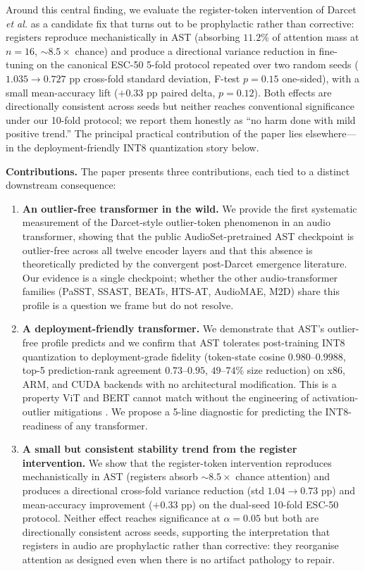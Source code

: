 \documentclass[conference]{IEEEtran}
\begin{document}
Around this central finding, we evaluate the register-token intervention of Darcet \emph{et al.} as a candidate fix that turns out to be prophylactic rather than corrective: registers reproduce mechanistically in AST (absorbing $11.2\%$ of attention mass at $n{=}16$, $\sim 8.5\times$ chance) and produce a directional variance reduction in fine-tuning on the canonical ESC-50 5-fold protocol repeated over two random seeds ($1.035 \to 0.727$ pp cross-fold standard deviation, F-test $p=0.15$ one-sided), with a small mean-accuracy lift ($+0.33$ pp paired delta, $p=0.12$). Both effects are directionally consistent across seeds but neither reaches conventional significance under our 10-fold protocol; we report them honestly as ``no harm done with mild positive trend.'' The principal practical contribution of the paper lies elsewhere---in the deployment-friendly INT8 quantization story below.

\textbf{Contributions.} The paper presents three contributions, each tied to a distinct downstream consequence:
\begin{enumerate}
    \item \textbf{An outlier-free transformer in the wild.} We provide the first systematic measurement of the Darcet-style outlier-token phenomenon in an audio transformer, showing that the public AudioSet-pretrained AST checkpoint is outlier-free across all twelve encoder layers and that this absence is theoretically predicted by the convergent post-Darcet emergence literature. Our evidence is a single checkpoint; whether the other audio-transformer families (PaSST, SSAST, BEATs, HTS-AT, AudioMAE, M2D) share this profile is a question we frame but do not resolve.
    \item \textbf{A deployment-friendly transformer.} We demonstrate that AST's outlier-free profile predicts and we confirm that AST tolerates post-training INT8 quantization to deployment-grade fidelity (token-state cosine $0.980$--$0.9988$, top-5 prediction-rank agreement $0.73$--$0.95$, $49$--$74\%$ size reduction) on x86, ARM, and CUDA backends with no architectural modification. This is a property ViT and BERT cannot match without the engineering of activation-outlier mitigations \cite{bondarenko2023quantizable}. We propose a 5-line diagnostic for predicting the INT8-readiness of any transformer.
    \item \textbf{A small but consistent stability trend from the register intervention.} We show that the register-token intervention reproduces mechanistically in AST (registers absorb $\sim 8.5\times$ chance attention) and produces a directional cross-fold variance reduction (std $1.04 \to 0.73$ pp) and mean-accuracy improvement ($+0.33$ pp) on the dual-seed 10-fold ESC-50 protocol. Neither effect reaches significance at $\alpha=0.05$ but both are directionally consistent across seeds, supporting the interpretation that registers in audio are prophylactic rather than corrective: they reorganise attention as designed even when there is no artifact pathology to repair.
\end{enumerate}
\end{document}
